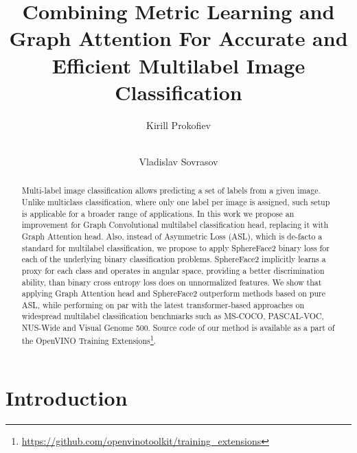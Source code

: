 \documentclass[runningheads]{llncs}
\begin{document}
%
\title{Combining Metric Learning and Graph Attention For Accurate and Efficient Multilabel Image Classification}
%
\titlerunning{}
%
\author{Kirill Prokofiev \and \\
Vladislav Sovrasov}
%
%
%
\maketitle              %
%
\begin{abstract}
  Multi-label image classification allows predicting a set of labels
  from a given image. Unlike multiclass classification, where
  only one label per image is assigned, such setup is applicable for a broader
  range of applications.
  In this work we propose an improvement for
  Graph Convolutional multilabel classification head, replacing it with
  Graph Attention head. Also, instead of Asymmetric Loss (ASL), which is de-facto
  a standard for multilabel classification, we propose to apply SphereFace2 binary loss
  for each of the underlying binary classification problems. SphereFace2 implicitly
  learns a proxy for each class and operates in angular space, providing a better
  discrimination ability, than binary cross entropy loss does on unnormalized features.
  We show that applying Graph Attention head and SphereFace2 outperform methods based on
  pure ASL, while performing on par with the latest transformer-based approaches
  on widespread multilabel classification benchmarks such as MS-COCO, PASCAL-VOC, NUS-Wide and Visual Genome 500.
  Source code of our method is available as a part of the OpenVINO{\texttrademark} Training
  Extensions\footnote{\url{https://github.com/openvinotoolkit/training_extensions}}.

\end{abstract}
%
%
%
\section{Introduction}
\end{document}
